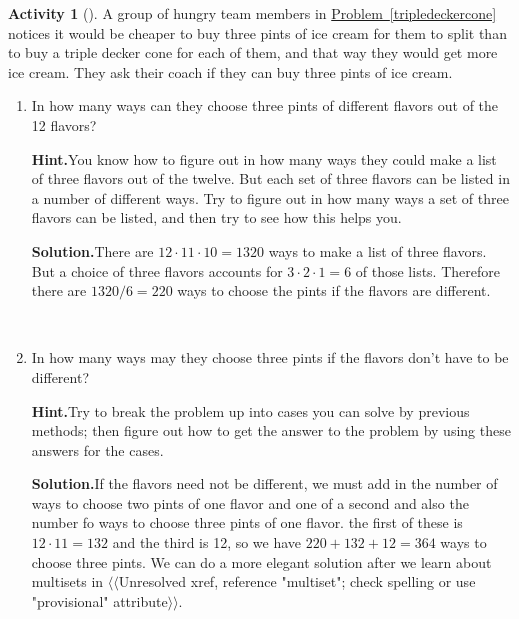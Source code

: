\documentclass[10pt,]{book}
\theoremstyle{plain}
\theoremstyle{definition}
\newtheorem{activity}[project]{Activity}
\numberwithin{equation}{chapter}
\begin{document}
\begin{activity}[]\label{icecreaminpints}
A group of hungry team members in \hyperref[tripledeckercone]{Problem~\ref{tripledeckercone}} notices it would be cheaper to buy three pints of ice cream for them to split than to buy a triple decker cone for each of them, and that way they would get more ice cream. They ask their coach if they can buy three pints of ice cream.%
~\par
\begin{enumerate}[label=(\alph*)]
 \item In how many ways can they choose three pints of different flavors out of the 12 flavors?%
\par\medskip\noindent%
\textbf{Hint.}\quad You know how to figure out in how many ways they could make a list of three flavors out of the twelve. But each set of three flavors can be listed in a number of different ways. Try to figure out in how many ways a set of three flavors can be listed, and then try to see how this helps you.%
\par\medskip\noindent%
\textbf{Solution.}\quad There are \(12\cdot11\cdot 10 = 1320\) ways to make a list of three flavors. But a choice of three flavors accounts for \(3\cdot2\cdot1 = 6\) of those lists. Therefore there are \(1320/6=220\) ways to choose the pints if the flavors are different.%

~\par
\item In how many ways may they choose three pints if the flavors don't have to be different?%
\par\medskip\noindent%
\textbf{Hint.}\quad Try to break the problem up into cases you can solve by previous methods; then figure out how to get the answer to the problem by using these answers for the cases.%
\par\medskip\noindent%
\textbf{Solution.}\quad If the flavors need not be different, we must add in the number of ways to choose two pints of one flavor and one of a second and also the number fo ways to choose three pints of one flavor. the first of these is \(12\cdot11
=132\) and the third is 12, so we have \(220+132+12=364\) ways to choose three pints. We can do a more elegant solution after we learn about multisets in {$\langle\langle$Unresolved xref, reference "multiset"; check spelling or use "provisional" attribute$\rangle\rangle$}.%

\end{enumerate}
\end{activity}
\end{document}
